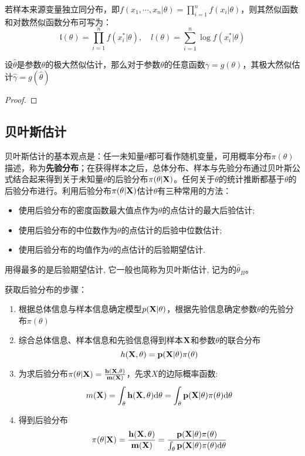 若样本来源变量独立同分布，即$f(x_1,\cdots ,x_n|\theta)=\prod_{i=1}^nf(x_i|\theta)$，则其然似函数和对数然似函数分布可写为：
\[ \mathfrak{l}(\theta) = \prod_{i=1}^nf(x_i^*|\theta), \quad l(\theta) = \sum_{i=1}^n \log f(x_i^*|\theta) \]

\begin{proposition}[极大然似估计的不变性]
    设$\hat{\theta}$是参数$\theta$的极大然似估计，那么对于参数$\theta$的任意函数$\gamma = g(\theta)$，其极大然似估计$\hat{\gamma}=g(\hat{\theta})$
\end{proposition}
\begin{proof}
\end{proof}

\subsection{贝叶斯估计}

贝叶斯估计的基本观点是：任一未知量$\theta$都可看作随机变量，可用概率分布$\pi(\theta)$描述，称为\textbf{先验分布}；在获得样本之后，总体分布、样本与先验分布通过贝叶斯公式结合起来得到关于未知量$\theta$的后验分布$\pi(\theta | \bf{X})$。任何关于$\theta$的统计推断都基于$\theta$的后验分布进行。利用后验分布$\pi(\theta|\bf{X})$估计$\theta$有三种常用的方法：
\begin{itemize}
    \item 使用后验分布的密度函数最大值点作为$\theta$的点估计的最大后验估计;
    \item 使用后验分布的中位数作为$\theta$的点估计的后验中位数估计;
    \item 使用后验分布的均值作为$\theta$的点估计的后验期望估计.
\end{itemize}
用得最多的是后验期望估计, 它一般也简称为贝叶斯估计, 记为的$\hat{\theta}_B$。

获取后验分布的步骤：
\begin{enumerate}
    \item 根据总体信息与样本信息确定模型$p(\bf{X} | \theta)$，根据先验信息确定参数$\theta$的先验分布$\pi(\theta)$
    \item 综合总体信息、样本信息和先验信息得到样本$\bf{X}$和参数$\theta$的联合分布
          \[h(\bf{X}, \theta)=p(\bf{X}|\theta) \pi(\theta)\]
    \item 为求后验分布$\pi(\theta|\bf{X})=\frac{h(\bf{X}, \theta)}{m(\bf{X})}$，先求$X$的边际概率函数:
          \[ m(\bf{X})=\int_{\bf{\theta}} h(\bf{X}, \theta) \mathrm{d} \theta=\int_{\bf{\theta}} p(\bf{X}| \theta) \pi(\theta) \mathrm{d} \theta \]
    \item 得到后验分布
          \[ \pi(\theta | \bf{X})=\frac{h(\bf{X}, \theta)}{m(\bf{X})}=\frac{p(\bf{X} | \theta) \pi(\theta)}{\int_{\bf{\theta}} p(\bf{X} | \theta) \pi(\theta) \mathrm{d} \theta} \]
\end{enumerate}


